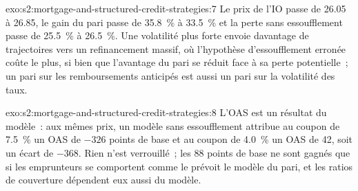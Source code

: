 \begin{solution}{exo:s2:mortgage-and-structured-credit-strategies:7}
Le prix de l'IO passe de 26.05 à 26.85, le gain du pari passe de 35.8~\% à 33.5~\% et la perte sans essoufflement passe de 25.5~\% à 26.5~\%. Une
volatilité plus forte envoie davantage de trajectoires vers un refinancement massif, où l'hypothèse d'essoufflement erronée coûte le plus, si bien que l'avantage du pari se réduit face à sa perte potentielle~;
un pari sur les remboursements anticipés est aussi un pari sur la volatilité des taux.
\end{solution}

\begin{solution}{exo:s2:mortgage-and-structured-credit-strategies:8}
L'OAS est un résultat du modèle~: aux mêmes prix, un modèle sans essoufflement attribue au coupon de 7.5~\% un OAS de $-326$ points de base et au coupon de 4.0~\% un OAS de
42, soit un écart de $-368$. Rien n'est verrouillé~; les 88 points de base ne sont gagnés que si les emprunteurs se comportent comme le prévoit le modèle du pari, et les
ratios de couverture dépendent eux aussi du modèle.
\end{solution}

